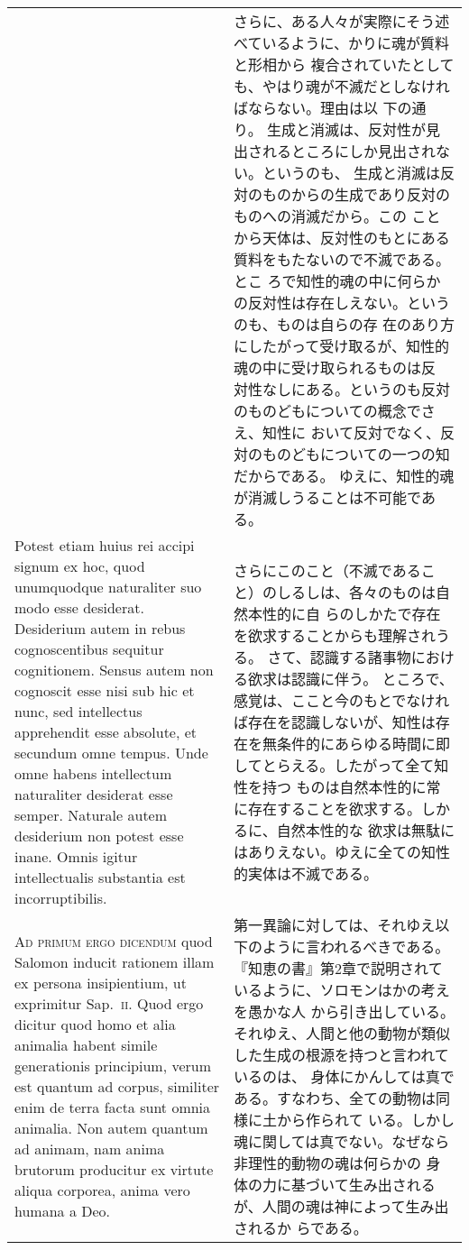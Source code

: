 \documentclass[paper=a4paper,fontsize=10pt,jafontsize=9pt,titlepage]{jlreq}
\begin{document}
\begin{longtable}{p{21em}p{21em}}
&

さらに、ある人々が実際にそう述べているように、かりに魂が質料と形相から
複合されていたとしても、やはり魂が不滅だとしなければならない。理由は以
下の通り。
生成と消滅は、反対性が見出されるところにしか見出されない。というのも、
 生成と消滅は反対のものからの生成であり反対のものへの消滅だから。この
 ことから天体は、反対性のもとにある質料をもたないので不滅である。とこ
 ろで知性的魂の中に何らかの反対性は存在しえない。というのも、ものは自らの存
 在のあり方にしたがって受け取るが、知性的魂の中に受け取られるものは反
 対性なしにある。というのも反対のものどもについての概念でさえ、知性に
 おいて反対でなく、反対のものどもについての一つの知だからである。
ゆえに、知性的魂が消滅しうることは不可能である。

\\

Potest etiam huius rei
accipi signum ex hoc, quod unumquodque naturaliter suo modo esse
desiderat. Desiderium autem in rebus cognoscentibus sequitur
cognitionem. Sensus autem non cognoscit esse nisi sub hic et nunc, sed
intellectus apprehendit esse absolute, et secundum omne tempus. Unde
omne habens intellectum naturaliter desiderat esse semper. Naturale
autem desiderium non potest esse inane. Omnis igitur intellectualis
substantia est incorruptibilis.


&

さらにこのこと（不滅であること）のしるしは、各々のものは自然本性的に自
 らのしかたで存在を欲求することからも理解されうる。
さて、認識する諸事物における欲求は認識に伴う。
ところで、感覚は、ここと今のもとでなければ存在を認識しないが、知性は存
 在を無条件的にあらゆる時間に即してとらえる。したがって全て知性を持つ
 ものは自然本性的に常に存在することを欲求する。しかるに、自然本性的な
 欲求は無駄にはありえない。ゆえに全ての知性的実体は不滅である。


\\



{\scshape Ad primum ergo dicendum} quod Salomon inducit rationem illam ex persona
insipientium, ut exprimitur Sap.~{\scshape ii}. Quod ergo dicitur quod homo et
alia animalia habent simile generationis principium, verum est quantum
ad corpus, similiter enim de terra facta sunt omnia animalia. Non
autem quantum ad animam, nam anima brutorum producitur ex virtute
aliqua corporea, anima vero humana a Deo. 



&

第一異論に対しては、それゆえ以下のように言われるべきである。
『知恵の書』第2章で説明されているように、ソロモンはかの考えを愚かな人
 から引き出している。
それゆえ、人間と他の動物が類似した生成の根源を持つと言われているのは、
 身体にかんしては真である。すなわち、全ての動物は同様に土から作られて
 いる。しかし魂に関しては真でない。なぜなら非理性的動物の魂は何らかの
 身体の力に基づいて生み出されるが、人間の魂は神によって生み出されるか
 らである。


\end{longtable}
\end{document}
